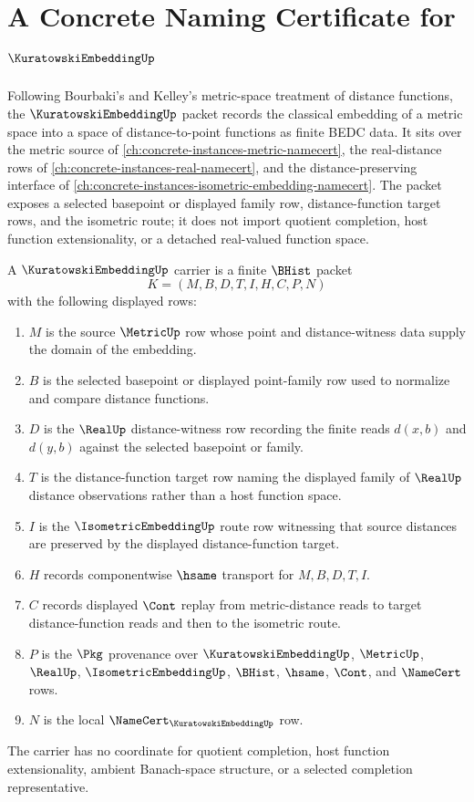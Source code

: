 \chapter{A Concrete Naming Certificate for $\KuratowskiEmbeddingUp$}
\label{ch:concrete-instances-kuratowski-embedding-namecert}

Following Bourbaki's and Kelley's metric-space treatment of distance functions, the $\KuratowskiEmbeddingUp$ packet records the classical embedding of a metric space into a space of distance-to-point functions as finite BEDC data. It sits over the metric source of \autoref{ch:concrete-instances-metric-namecert}, the real-distance rows of \autoref{ch:concrete-instances-real-namecert}, and the distance-preserving interface of \autoref{ch:concrete-instances-isometric-embedding-namecert}. The packet exposes a selected basepoint or displayed family row, distance-function target rows, and the isometric route; it does not import quotient completion, host function extensionality, or a detached real-valued function space.

\begin{definition}
\label{def:kuratowski-embedding-carrier}
A $\KuratowskiEmbeddingUp$ carrier is a finite $\BHist$ packet
$$
K=(M,B,D,T,I,H,C,P,N)
$$
with the following displayed rows:
\begin{enumerate}
\item $M$ is the source $\MetricUp$ row whose point and distance-witness data supply the domain of the embedding.
\item $B$ is the selected basepoint or displayed point-family row used to normalize and compare distance functions.
\item $D$ is the $\RealUp$ distance-witness row recording the finite reads $d(x,b)$ and $d(y,b)$ against the selected basepoint or family.
\item $T$ is the distance-function target row naming the displayed family of $\RealUp$ distance observations rather than a host function space.
\item $I$ is the $\IsometricEmbeddingUp$ route row witnessing that source distances are preserved by the displayed distance-function target.
\item $H$ records componentwise $\hsame$ transport for $M,B,D,T,I$.
\item $C$ records displayed $\Cont$ replay from metric-distance reads to target distance-function reads and then to the isometric route.
\item $P$ is the $\Pkg$ provenance over $\KuratowskiEmbeddingUp$, $\MetricUp$, $\RealUp$, $\IsometricEmbeddingUp$, $\BHist$, $\hsame$, $\Cont$, and $\NameCert$ rows.
\item $N$ is the local $\NameCert_{\KuratowskiEmbeddingUp}$ row.
\end{enumerate}
The carrier has no coordinate for quotient completion, host function extensionality, ambient Banach-space structure, or a selected completion representative.
\end{definition}

